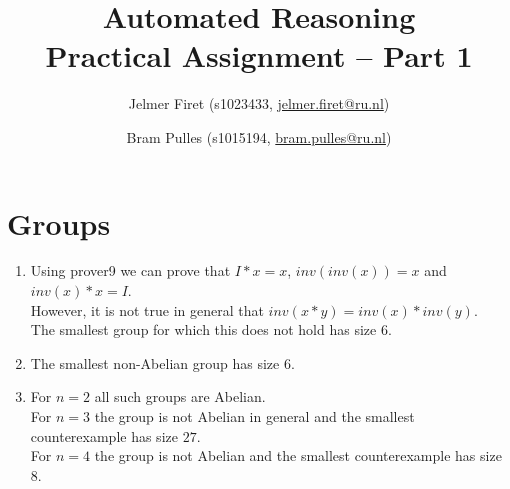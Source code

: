 \documentclass{scrartcl}
\author{Jelmer Firet (s1023433, \href{mailto:jelmer.firet@ru.nl}{jelmer.firet@ru.nl}) \and
Bram Pulles (s1015194, \href{mailto:bram.pulles@ru.nl}{bram.pulles@ru.nl})}
\title{\textbf{Automated Reasoning\\Practical Assignment -- Part 1}}
\begin{document}
\maketitle

\section{Groups} %
\label{sec:groups}
\begin{enumerate}[label=\alph*)]
\item 
	Using prover9 we can prove that $I*x=x$, $inv(inv(x))=x$ and $inv(x)*x=I$.\\
	However, it is not true in general that $inv(x*y)=inv(x)*inv(y)$.\\
	The smallest group for which this does not hold has size $6$.
\item 
	The smallest non-Abelian group has size $6$.
\item 
	For $n=2$ all such groups are Abelian.\\
	For $n=3$ the group is not Abelian in general and the smallest counterexample has size $27$.\\
	For $n=4$ the group is not Abelian and the smallest counterexample has size $8$.
\end{enumerate}
\end{document}

